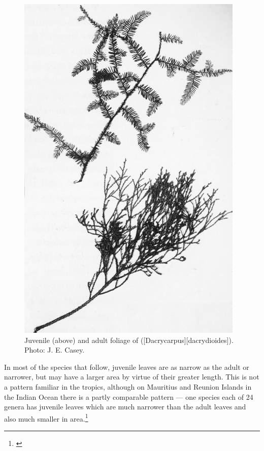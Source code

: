 \begin{figure}[t]
\begin{minipage}[t]{\textwidth}
\begin{minipage}[t]{(\textwidth-\fgap) * \real{0.497}}
			\centering
			\includegraphics[width=\textwidth]{graphics/figure22kahikatea.jpg}
			\caption[Kahikatea foliage]{Juvenile (above) and adult foliage of  ([Dacrycarpus][dacrydioides]).
			Photo: J. E. Casey.}%
			\label{fig:22kahikatea}
		\end{minipage}
	\end{minipage}
\end{figure}

In most of the species that follow, juvenile leaves are as narrow as the adult or narrower, but may have a larger area by virtue of their greater length.
This is not a pattern familiar in the tropics, although on Mauritius and Reunion Islands in the Indian Ocean there is a partly comparable pattern --- one species each of 24 genera has juvenile leaves which are much narrower than the adult leaves and also much smaller in area.\footnote{\cite{friedmann1976observations}}

